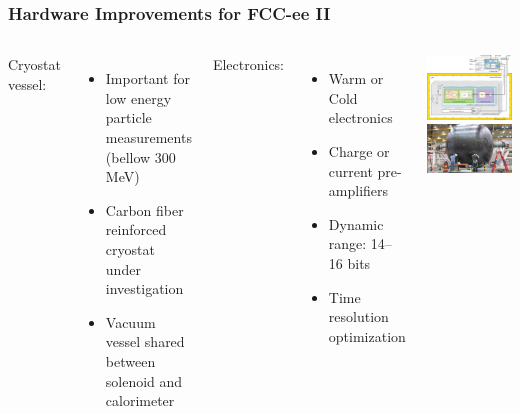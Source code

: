 \documentclass[aspectratio=169]{beamer}
\newcommand{\bluetext}[1]{%
  \textcolor{myBlue}{#1}
}
\begin{document}
\begin{frame}
  \frametitle{Hardware Improvements for FCC-ee II}

  \begin{columns}[c]

    \bluetext{Cryostat vessel:}
    \begin{itemize}
      \item Important for low energy particle measurements (bellow 300 MeV)
      \item Carbon fiber reinforced cryostat under investigation
      \item Vacuum vessel shared between solenoid and calorimeter
    \end{itemize}
    \bluetext{Electronics:}
    \begin{itemize}
      \item Warm or Cold electronics
      \item Charge or current pre-amplifiers
      \item Dynamic range: 14--16 bits
      \item Time resolution optimization
    \end{itemize}


    \begin{center}
      \includegraphics[width=0.7\linewidth]{figures/protodune-electronics.png}\\[0.5em]
      \includegraphics[width=0.9\linewidth]{figures/nasa-cryotank.jpg}
    \end{center}
  \end{columns}
\end{frame}
\end{document}
